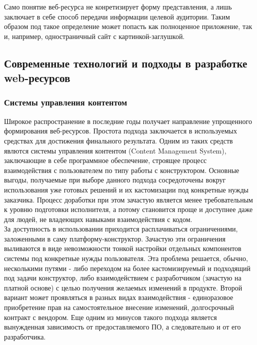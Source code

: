     Само понятие веб-ресурса не конретизирует форму представления, а лишь заключает в себе способ передачи информации целевой аудитории.
    Таким образом под такое определение может попасть как полноценное приложение, так и, например, одностраничный сайт с картинкой-заглушкой.


\subsection{Современные технологий и подходы в разработке web-ресурсов}
    \subsubsection{Системы управления контентом}
        Широкое распространение в последние годы получает направление упрощенного формирования веб-ресурсов.
        Простота подхода заключается в используемых средствах для достижения финального результата.
        Одним из таких средств явлются системы управления контентом (Content Management System), заключающие в себе программное обеспечение, строящее процесс взаимодействия с пользователем по типу работы с конструктором. %
        Основные выгоды, получаемые при выборе данного подхода сосредоточены вокруг использования уже готовых решений и их кастомизации под конкретные нужды заказчика.
        Процесс доработки при этом зачастую является менее требовательным к уровню подготовки исполнителя, а потому становится проще и доступнее даже для людей, не владеющих навыками взаимодействия с кодом.\\
        За доступность в использовании приходится расплачиваться ограничениями, заложенными в саму платформу-конструктор.
        Зачастую эти ограничения выливаются в виде невозможности тонкой настройки отдельных компонентов системы под конкретные нужды пользователя.
        Эта проблема решается, обычно, несколькими путями - либо переходом на более кастомизируемый и подходящий под задачи конструктор, либо взаимодействием с разработчиком (зачастую на платной основе) с целью получения желаемых изменений в продукте.
        Второй вариант может проявляться в разных видах взаимодействия - единоразовое приобретение прав на самостоятельное внесение изменений, долгосрочный контракт с вендором.
        Еще одним из минусов такого подхода является вынужденная зависимость от предоставляемого ПО, а следовательно и от его разработчика.

